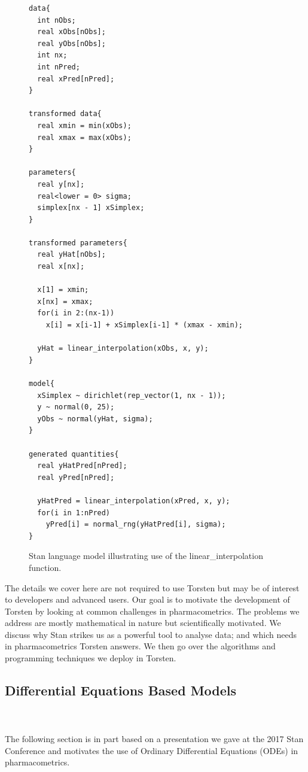 \documentclass[11pt]{amsart}
\newenvironment{fmpage}[1]
     {\begin{lrbox}{\fmbox}\begin{minipage}{#1}}
     {\end{minipage}\end{lrbox}\fbox{\usebox{\fmbox}}}
\begin{document}
\begin{figure}[htbp]
\caption{Stan language model illustrating use of the
  linear\_interpolation function.}
\begin{center}
\begin{small}
\begin{fmpage}{\textwidth - .75in}
\begin{lstlisting}[basicstyle=\footnotesize\ttfamily,mathescape=true,flexiblecolumns=true,frame=single,escapeinside=`']
data{
  int nObs;
  real xObs[nObs];
  real yObs[nObs];
  int nx;
  int nPred;
  real xPred[nPred];
}

transformed data{
  real xmin = min(xObs);
  real xmax = max(xObs);
}

parameters{
  real y[nx];
  real<lower = 0> sigma;
  simplex[nx - 1] xSimplex;
}

transformed parameters{
  real yHat[nObs];
  real x[nx];

  x[1] = xmin;
  x[nx] = xmax;
  for(i in 2:(nx-1))
    x[i] = x[i-1] + xSimplex[i-1] * (xmax - xmin);

  yHat = linear_interpolation(xObs, x, y);
}

model{
  xSimplex ~ dirichlet(rep_vector(1, nx - 1));
  y ~ normal(0, 25);
  yObs ~ normal(yHat, sigma);
}

generated quantities{
  real yHatPred[nPred];
  real yPred[nPred];

  yHatPred = linear_interpolation(xPred, x, y);
  for(i in 1:nPred)
    yPred[i] = normal_rng(yHatPred[i], sigma);
}
\end{lstlisting}
\end{fmpage}
\end{small}
\end{center}
\label{linearInterpolation}
\end{figure}

\iffalse
The details we cover here are not required to use Torsten but may be of interest to developers and advanced users. Our goal is to motivate the development of Torsten by looking at common challenges in pharmacometrics. The problems we address are mostly mathematical in nature but scientifically motivated. We discuss why Stan strikes us as a powerful tool to analyse data; and which needs in pharmacometrics Torsten answers. We then go over the algorithms and programming techniques we deploy in Torsten. 

\subsection{Differential Equations Based Models} \ \\ \ \\
The following section is in part based on a presentation we gave at the 2017 Stan Conference \cite{StanCon2017} and motivates the use of Ordinary Differential Equations (ODEs) in pharmacometrics.
\end{document}
